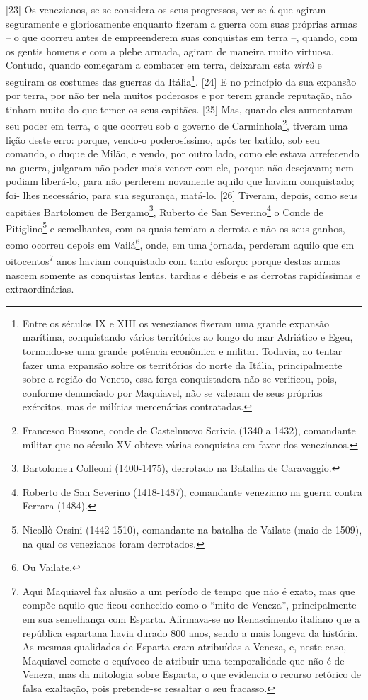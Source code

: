 {[}23{]} Os venezianos, se se considera os seus progressos, ver-se-á que
agiram seguramente e gloriosamente enquanto fizeram a guerra com suas
próprias armas -- o que ocorreu antes de empreenderem suas conquistas em
terra --, quando, com os gentis homens e com a plebe armada, agiram de
maneira muito virtuosa. Contudo, quando começaram a combater em terra,
deixaram esta \emph{virtù} e seguiram os costumes das guerras da
Itália\footnote{Entre os séculos IX e XIII os venezianos fizeram uma
  grande expansão marítima, conquistando vários territórios ao longo do
  mar Adriático e Egeu, tornando-se uma grande potência econômica e
  militar. Todavia, ao tentar fazer uma expansão sobre os territórios do
  norte da Itália, principalmente sobre a região do Veneto, essa força
  conquistadora não se verificou, pois, conforme denunciado por
  Maquiavel, não se valeram de seus próprios exércitos, mas de milícias
  mercenárias contratadas.}. {[}24{]} E no princípio da sua expansão por
terra, por não ter nela muitos poderosos e por terem grande reputação,
não tinham muito do que temer os seus capitães. {[}25{]} Mas, quando
eles aumentaram seu poder em terra, o que ocorreu sob o governo de
Carminhola\footnote{Francesco Bussone, conde de Castelnuovo Scrivia
  (1340 a 1432), comandante militar que no século XV obteve várias
  conquistas em favor dos venezianos.}, tiveram uma lição deste erro:
porque, vendo-o poderosíssimo, após ter batido, sob seu comando, o duque
de Milão, e vendo, por outro lado, como ele estava arrefecendo na
guerra, julgaram não poder mais vencer com ele, porque não desejavam;
nem podiam liberá-lo, para não perderem novamente aquilo que haviam
conquistado; foi- lhes necessário, para sua segurança, matá-lo. {[}26{]}
Tiveram, depois, como seus capitães Bartolomeu de Bergamo\footnote{Bartolomeu
  Colleoni (1400-1475), derrotado na Batalha de Caravaggio.}, Ruberto de
San Severino\footnote{Roberto de San Severino (1418-1487), comandante
  veneziano na guerra contra Ferrara (1484).} o Conde de
Pitiglino\footnote{Nicollò Orsini (1442-1510), comandante na batalha de
  Vailate (maio de 1509), na qual os venezianos foram derrotados.} e
semelhantes, com os quais temiam a derrota e não os seus ganhos, como
ocorreu depois em Vailá\footnote{Ou Vailate.}, onde, em uma jornada,
perderam aquilo que em oitocentos\footnote{Aqui Maquiavel faz alusão a
  um período de tempo que não é exato, mas que compõe aquilo que ficou
  conhecido como o ``mito de Veneza'', principalmente em sua semelhança
  com Esparta. Afirmava-se no Renascimento italiano que a república
  espartana havia durado 800 anos, sendo a mais longeva da história. As
  mesmas qualidades de Esparta eram atribuídas a Veneza, e, neste caso,
  Maquiavel comete o equívoco de atribuir uma temporalidade que não é de
  Veneza, mas da mitologia sobre Esparta, o que evidencia o recurso
  retórico de falsa exaltação, pois pretende-se ressaltar o seu
  fracasso.} anos haviam conquistado com tanto esforço: porque destas
armas nascem somente as conquistas lentas, tardias e débeis e as
derrotas rapidíssimas e extraordinárias.

